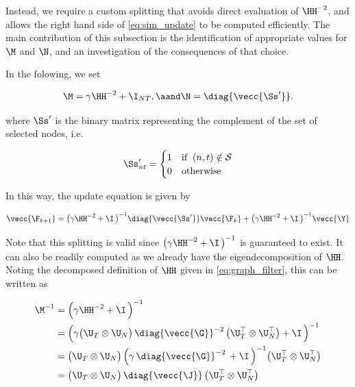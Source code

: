 Instead, we require a custom splitting that avoids direct evaluation of $\HH^{-2}$, and allows the right hand side of \cref{eq:sim_update} to be computed efficiently. The main contribution of this subsection is the identification of appropriate values for $\M$ and $\N$, and an investigation of the consequences of that choice. 

In the folowing, we set 

\begin{equation}
    \M = \gamma \HH^{-2} + \I_{NT}, \aand \N = \diag{\vecc{\Ss'}}.
\end{equation}

where $\Ss'$ is the binary matrix representing the complement of the set of selected nodes, i.e.

\begin{equation}
    \label{eq:S_}
    \Ss'_{nt} = \begin{cases}
        1 & \text{if} \;\; (n, t) \notin \mathcal{S} \\
        0 & \text{otherwise}
    \end{cases}
\end{equation}

In this way, the update equation is given by 

\begin{equation}
    \label{eq:sim_update2}
    \vecc{\F_{k+1}} = \big(\gamma \HH^{-2} + \I \, \big)^{-1}  \diag{\vecc{\Ss'}} \vecc{\F_{k}} + \big(\gamma \HH^{-2} + \I \, \big)^{-1} \vecc{\Y}
\end{equation}



Note that this splitting is valid since $\big(\gamma\HH^{-2} + \I \, \big)^{-1}$ is guaranteed to exist. It can also be readily computed as we already have the eigendecomposition of $\HH$. Noting the decomposed definition of $\HH$ given in \cref{eq:graph_filter}, this can be written as

\begin{align}
    \label{eq:inv}
    \M^{-1} & = \Big( \gamma \HH^{-2} + \I \, \Big)^{-1} \notag \\
            & = \Big( \gamma \big(\U_T \otimes \U_N\big)\, \diag{\vecc{\G}}^{-2}\,  \big(\U_T^\top \otimes \U_N^\top\big)  + \I \, \Big)^{-1} \notag   \\
            & = \big(\U_T \otimes \U_N\big)\, \Big( \gamma \, \diag{\vecc{\G}}^{-2}\,    + \I \, \Big)^{-1} \big(\U_T^\top \otimes \U_N^\top\big) \notag \\
            & = \big(\U_T \otimes \U_N\big)\, \diag{\vecc{\J}}\,  \big(\U_T^\top \otimes \U_N^\top\big)
\end{align}

